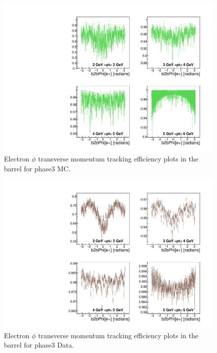 \documentclass[a4paper,11pt,twosided,final,german,openbib,pdftex,listof=totoc,bibliography=totoc]{scrbook}
\begin{document}
\begin{appendix}
\clearpage



\begin{figure}[!htbp]
	\centering
	\includegraphics[width=\textwidth]{Plots/master3/xPtMPhiemBarrel_MCP3}
	\caption[Transverse Momentum $\phi$ Electron Barrel Efficiency Phase3 MC]{Electron $\phi$ transverse momentum tracking efficiency plots in the barrel for phase3 MC.}
	\label{plt:PtMPhiemBarrel3_MC}
\end{figure}


\begin{figure}[!htbp]
	\centering
	\includegraphics[width=\textwidth]{Plots/master3/xPtMPhiemBarrel_DataP3}
	\caption[Transverse Momentum $\phi$ Electron Barrel Efficiency Phase3 Data]{Electron $\phi$ transverse momentum tracking efficiency plots in the barrel for phase3 Data.}
	\label{plt:PtMPhiemBarrel3_Data}
\end{figure}





\end{appendix}
\end{document}
